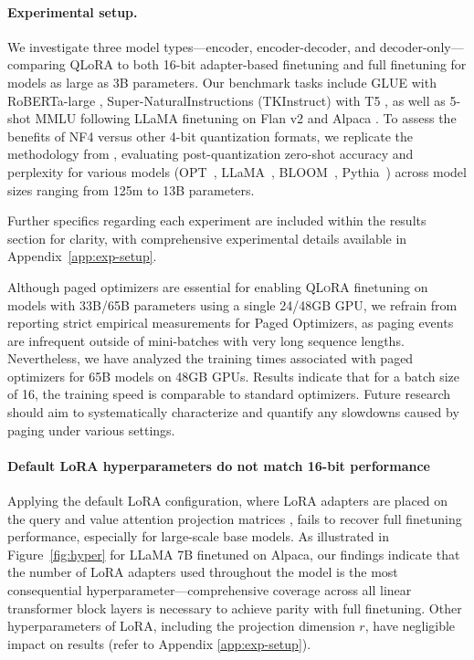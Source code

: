 \paragraph{Experimental setup.} We investigate three model types—encoder, encoder-decoder, and decoder-only—comparing QLoRA to both 16-bit adapter-based finetuning and full finetuning for models as large as 3B parameters. Our benchmark tasks include GLUE \citep{wang2018glue} with RoBERTa-large \citep{liu2019roberta}, Super-NaturalInstructions (TKInstruct) \citep{wang2022super} with T5 \citep{t5}, as well as 5-shot MMLU \citep{hendrycksmeasuring} following LLaMA finetuning on Flan v2 \citep{longpre2023flan} and Alpaca \citep{alpaca}. To assess the benefits of NF4 versus other 4-bit quantization formats, we replicate the methodology from \citet{dettmers2022case}, evaluating post-quantization zero-shot accuracy and perplexity for various models (OPT~\citep{zhang2022opt}, LLaMA~\citep{touvron2023llama}, BLOOM~\citep{scao2022bloom}, Pythia~\citep{biderman2023pythia}) across model sizes ranging from 125m to 13B parameters.

Further specifics regarding each experiment are included within the results section for clarity, with comprehensive experimental details available in Appendix~\ref{app:exp-setup}.

Although paged optimizers are essential for enabling \textsc{QLoRA} finetuning on models with 33B/65B parameters using a single 24/48GB GPU, we refrain from reporting strict empirical measurements for Paged Optimizers, as paging events are infrequent outside of mini-batches with very long sequence lengths. Nevertheless, we have analyzed the training times associated with paged optimizers for 65B models on 48GB GPUs. Results indicate that for a batch size of 16, the training speed is comparable to standard optimizers. Future research should aim to systematically characterize and quantify any slowdowns caused by paging under various settings.

\paragraph{Default LoRA hyperparameters do not match 16-bit performance}

Applying the default LoRA configuration, where LoRA adapters are placed on the query and value attention projection matrices \citep{hu2021lora}, fails to recover full finetuning performance, especially for large-scale base models. As illustrated in Figure~\ref{fig:hyper} for LLaMA 7B finetuned on Alpaca, our findings indicate that the number of LoRA adapters used throughout the model is the most consequential hyperparameter—comprehensive coverage across all linear transformer block layers is necessary to achieve parity with full finetuning. Other hyperparameters of LoRA, including the projection dimension $r$, have negligible impact on results (refer to Appendix \ref{app:exp-setup}).

